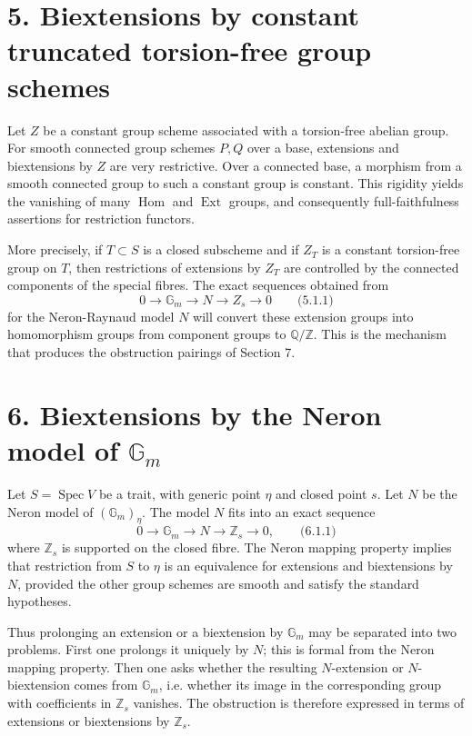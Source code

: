 \documentclass[11pt]{article}
\providecommand{\Spec}{\operatorname{Spec}}
\providecommand{\Z}{\mathbb Z}
\providecommand{\Q}{\mathbb Q}
\providecommand{\Gm}{\mathbb G_m}
\providecommand{\Hom}{\operatorname{Hom}}
\providecommand{\Ext}{\operatorname{Ext}}
\providecommand{\Ext}{\operatorname{Ext}}
\providecommand{\Hom}{\operatorname{Hom}}
\providecommand{\Spec}{\operatorname{Spec}}
\providecommand{\Gm}{\mathbb G_m}
\providecommand{\Z}{\mathbb Z}
\providecommand{\Q}{\mathbb Q}
\begin{document}
\section*{5. Biextensions by constant truncated torsion-free group schemes}

Let \(Z\) be a constant group scheme associated with a torsion-free abelian group.  For smooth connected group schemes \(P,Q\) over a base, extensions and biextensions by \(Z\) are very restrictive.  Over a connected base, a morphism from a smooth connected group to such a constant group is constant.  This rigidity yields the vanishing of many \(\Hom\) and \(\Ext\) groups, and consequently full-faithfulness assertions for restriction functors.

More precisely, if \(T\subset S\) is a closed subscheme and if \(Z_T\) is a constant torsion-free group on \(T\), then restrictions of extensions by \(Z_T\) are controlled by the connected components of the special fibres.  The exact sequences obtained from
\[
        0\longrightarrow \Gm\longrightarrow N\longrightarrow Z_s\longrightarrow 0
\qquad\text{(5.1.1)}
\]
for the Neron-Raynaud model \(N\) will convert these extension groups into homomorphism groups from component groups to \(\Q/\Z\).  This is the mechanism that produces the obstruction pairings of Section 7.

\section*{6. Biextensions by the Neron model of \(\Gm\)}

Let \(S=\Spec V\) be a trait, with generic point \(\eta\) and closed point \(s\).  Let \(N\) be the Neron model of \((\Gm)_\eta\).  The model \(N\) fits into an exact sequence
\[
        0\longrightarrow \Gm\longrightarrow N\longrightarrow \Z_s\longrightarrow 0,
\qquad\text{(6.1.1)}
\]
where \(\Z_s\) is supported on the closed fibre.  The Neron mapping property implies that restriction from \(S\) to \(\eta\) is an equivalence for extensions and biextensions by \(N\), provided the other group schemes are smooth and satisfy the standard hypotheses.

Thus prolonging an extension or a biextension by \(\Gm\) may be separated into two problems.  First one prolongs it uniquely by \(N\); this is formal from the Neron mapping property.  Then one asks whether the resulting \(N\)-extension or \(N\)-biextension comes from \(\Gm\), i.e. whether its image in the corresponding group with coefficients in \(\Z_s\) vanishes.  The obstruction is therefore expressed in terms of extensions or biextensions by \(\Z_s\).
\end{document}
